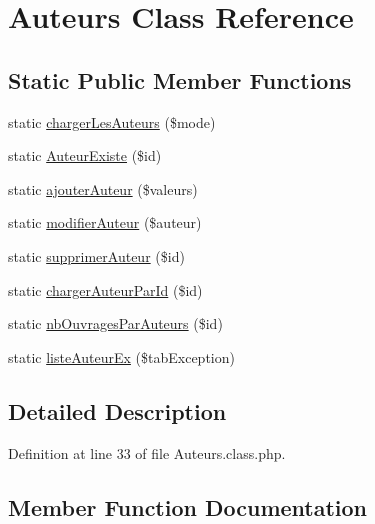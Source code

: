 \hypertarget{class_auteurs}{}\section{Auteurs Class Reference}
\label{class_auteurs}
\subsection*{Static Public Member Functions}
\begin{DoxyCompactItemize}
\item 
static \hyperlink{class_auteurs_ab4cdf0e170009a70a0b8c17b03a76ee9}{charger\+Les\+Auteurs} (\$mode)
\item 
static \hyperlink{class_auteurs_ab06d5f0fe343a9d54632aab5086bc67d}{Auteur\+Existe} (\$id)
\item 
static \hyperlink{class_auteurs_af5d1963f90a390287ae3de182dd7adba}{ajouter\+Auteur} (\$valeurs)
\item 
static \hyperlink{class_auteurs_a5f90bcbe10e2c15932d5f04e9a44e83f}{modifier\+Auteur} (\$auteur)
\item 
static \hyperlink{class_auteurs_abdb96363f4fa17b65d7fc97e18993579}{supprimer\+Auteur} (\$id)
\item 
static \hyperlink{class_auteurs_a3180877cbada17e6cd00e5e043e2b189}{charger\+Auteur\+Par\+Id} (\$id)
\item 
static \hyperlink{class_auteurs_a55283b4d022eca02905196418e4a8535}{nb\+Ouvrages\+Par\+Auteurs} (\$id)
\item 
static \hyperlink{class_auteurs_acaeff693a5c5d72b45bdce511687fc97}{liste\+Auteur\+Ex} (\$tab\+Exception)
\end{DoxyCompactItemize}


\subsection{Detailed Description}


Definition at line 33 of file Auteurs.\+class.\+php.



\subsection{Member Function Documentation}
\mbox{\label{class_auteurs_af5d1963f90a390287ae3de182dd7adba}} 
